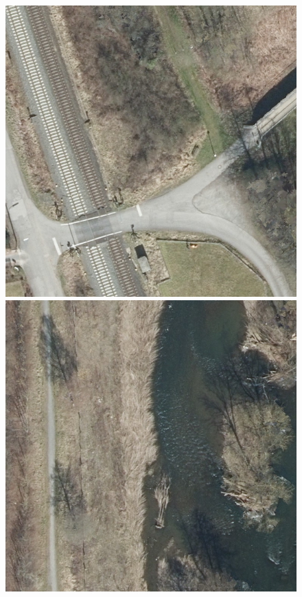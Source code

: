 \begin{figure}[h]
    \hspace{1mm}
    \includegraphics[width=\LabelConsiderationImageWidth]{images/consideration_labels/69493}
    \hspace{1mm}
    \includegraphics[width=\LabelConsiderationImageWidth]{images/consideration_labels/71270}


\end{figure}
